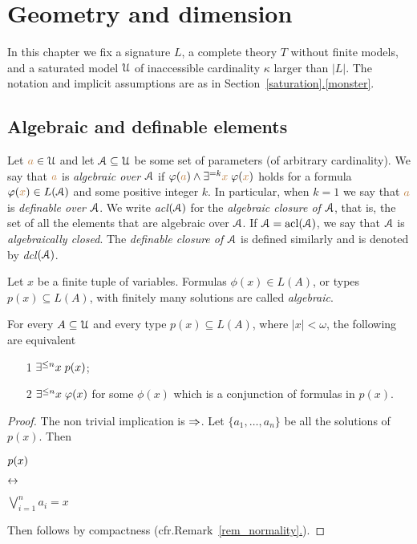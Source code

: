 \chapter{Geometry and dimension}\label{geometria}



\def\medrel#1{\parbox[t]{5ex}{$\displaystyle\hfil #1$}}
\def\ceq#1#2#3{\parbox{35ex}{$\displaystyle #1$}\medrel{#2}$\displaystyle  #3$}

In this chapter we fix a signature $L$, a complete theory $T$ without finite models, and a saturated model $\EuScript U$ of inaccessible cardinality $\kappa$ larger than $|L|$.
The notation and implicit assumptions are as in Section~\hyperref[monster]{\ref*{saturation}.\ref*{monster}}.


\section{Algebraic and definable elements}\label{acl}

Let ${\color{brown} a}\in\EuScript U$ and let $\EuScript A\subseteq\EuScript U$ be some set of parameters (of arbitrary cardinality).
We say that ${\color{brown} a}$ is \emph{algebraic over $\EuScript A$\/} if $\varphi({\color{brown} a})\wedge\exists^{=k}{\color{brown} x}\;\varphi({\color{brown} x})$ holds for a formula $\varphi({\color{brown} x})\in L(\EuScript A)$ and  some positive integer $k$.
In particular, when $k=1$ we say that ${\color{brown} a}$ is \emph{definable over $\EuScript A$}.
We write \emph{acl$(\EuScript A)$} for the \emph{algebraic closure of $\EuScript A$}, that is, the set of all the elements that are algebraic over $\EuScript A$.
If $\EuScript A=\mathop{\rm acl}(\EuScript A)$, we say that $\EuScript A$ is \emph{algebraically closed}.
The \emph{definable closure of $\EuScript A$\/} is defined similarly and is denoted by \emph{dcl$(\EuScript A)$}.


Let $x$ be a finite tuple of variables.
Formulas $\phi(x)\in L(A)$, or types $p(x)\subseteq L(A)$, with finitely many solutions are called \emph{algebraic}.

\begin{proposition}\label{prop_tipialgebrici}
For every $A\subseteq\EuScript U$ and every type $p(x)\subseteq L(A)$, where $|x|<\omega$, the following are equivalent
\begin{itemize} 
\item[1] $\exists^{\le n}x\; p(x)$;
\item[2] $\exists^{\le n}x\;\varphi(x)$ for some $\phi(x)$ which is a conjunction of formulas in $p(x)$.
\end{itemize}
\end{proposition}
\begin{proof} The non trivial implication is $\Rightarrow$.
Let $\{a_1,\dots,a_n\}$ be all the solutions of $p(x)$.
Then 

\ceq{\hfill p(x)}{\iff}{\bigvee^n_{i=1}a_i=x}

Then  follows by compactness (cfr.\@ Remark~\hyperref[rem_normality]{\ref*{rem_normality}.}).
\end{proof}

